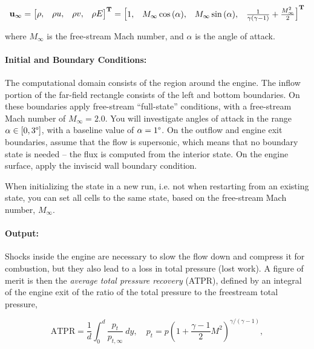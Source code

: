 \begin{equation}\label{eqn:flow}
    \bf{u}_{\infty} = \begin{bmatrix} \rho, & \rho u, & \rho v, & \rho E \end{bmatrix}^{T} = \begin{bmatrix}
        1, & M_\infty\cos{(\alpha)}, & M_\infty\sin{(\alpha)}, & \frac{1}{\gamma(\gamma-1)} + \frac{M_\infty^2}{2}
    \end{bmatrix}^T
\end{equation}

where $M_\infty$ is the free-stream Mach number, and $\alpha$ is the angle of attack.

\paragraph{Initial and Boundary Conditions:} The computational domain consists of the region around the engine. The inflow portion of the far-field rectangle consists of the left and bottom boundaries. On these boundaries apply free-stream ``full-state'' conditions, with a free-stream Mach number of $M_\infty = 2.0$. You will investigate angles of attack in the range $\alpha \in [0, 3\degree]$, with a baseline value of $\alpha = 1\degree$. On the outflow and engine exit boundaries, assume that the flow is supersonic, which means that no boundary state is needed -- the flux is computed from the interior state. On the engine surface, apply the inviscid wall boundary condition.

When initializing the state in a new run, i.e. not when restarting from an existing state, you can set all cells to the same state, based on the free-stream Mach number, $M_\infty$.


\paragraph{Output:} Shocks inside the engine are necessary to slow the flow down and compress it for combustion, but they also lead to a loss in total pressure (lost work). A figure of merit is then the
\textit{average total pressure recovery} (ATPR), defined by an integral of the engine exit of the ratio of the
total pressure to the freestream total pressure,

\begin{equation}\label{eqn:ATPR}
    \text{ATPR} = \frac{1}{d}\int_0^d\frac{p_t}{p_{t,\infty}}\ dy,\quad p_t = p\left(1 + \frac{\gamma - 1}{2}M^2\right)^{\gamma/(\gamma-1)},
\end{equation}

